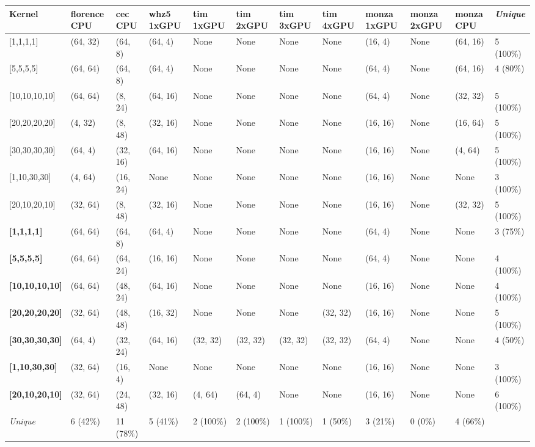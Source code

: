 \begin{tabular}{|p{1.8cm} | p{1cm} | p{1cm} | p{1cm} | p{1cm} | p{1cm} | p{1cm} | p{1cm} | p{1cm} | p{1cm} | p{1cm} | p{1.1cm}|}
\hline
\textbf{Kernel} & \textbf{florence CPU} & \textbf{cec CPU} & \textbf{whz5 1xGPU} & \textbf{tim 1xGPU} & \textbf{tim 2xGPU} & \textbf{tim 3xGPU} & \textbf{tim 4xGPU} & \textbf{monza 1xGPU} & \textbf{monza 2xGPU} & \textbf{monza CPU} & \textit{Unique}\\
\hline
{[}1,1,1,1{]} & (64, 32) & (64, 8) & (64, 4) & None & None & None & None & (16, 4) & None & (64, 16) & 5 (100\%)\\
{[}5,5,5,5{]} & (64, 64) & (64, 8) & (64, 4) & None & None & None & None & (64, 4) & None & (64, 16) & 4 (80\%)\\
{[}10,10,10,10{]} & (64, 64) & (8, 24) & (64, 16) & None & None & None & None & (64, 4) & None & (32, 32) & 5 (100\%)\\
{[}20,20,20,20{]} & (4, 32) & (8, 48) & (32, 16) & None & None & None & None & (16, 16) & None & (16, 64) & 5 (100\%)\\
{[}30,30,30,30{]} & (64, 4) & (32, 16) & (64, 16) & None & None & None & None & (16, 16) & None & (4, 64) & 5 (100\%)\\
{[}1,10,30,30{]} & (4, 64) & (16, 24) & None & None & None & None & None & (16, 16) & None & None & 3 (100\%)\\
{[}20,10,20,10{]} & (32, 64) & (8, 48) & (32, 16) & None & None & None & None & (16, 16) & None & (32, 32) & 5 (100\%)\\
\textbf{{[}1,1,1,1{]}} & (64, 64) & (64, 8) & (64, 4) & None & None & None & None & (64, 4) & None & None & 3 (75\%)\\
\textbf{{[}5,5,5,5{]}} & (64, 64) & (64, 24) & (16, 16) & None & None & None & None & (64, 4) & None & None & 4 (100\%)\\
\textbf{{[}10,10,10,10{]}} & (64, 64) & (48, 24) & (64, 16) & None & None & None & None & (16, 16) & None & None & 4 (100\%)\\
\textbf{{[}20,20,20,20{]}} & (32, 64) & (48, 48) & (16, 32) & None & None & None & (32, 32) & (16, 16) & None & None & 5 (100\%)\\
\textbf{{[}30,30,30,30{]}} & (64, 4) & (32, 24) & (64, 16) & (32, 32) & (32, 32) & (32, 32) & (32, 32) & (64, 4) & None & None & 4 (50\%)\\
\textbf{{[}1,10,30,30{]}} & (32, 64) & (16, 4) & None & None & None & None & None & (16, 16) & None & None & 3 (100\%)\\
\textbf{{[}20,10,20,10{]}} & (32, 64) & (24, 48) & (32, 16) & (4, 64) & (64, 4) & None & None & (16, 16) & None & None & 6 (100\%)\\
\hline
\textit{Unique} & 6 (42\%) & 11 (78\%) & 5 (41\%) & 2 (100\%) & 2 (100\%) & 1 (100\%) & 1 (50\%) & 3 (21\%) & 0 (0\%) & 4 (66\%) & \\
\hline
\end{tabular}
